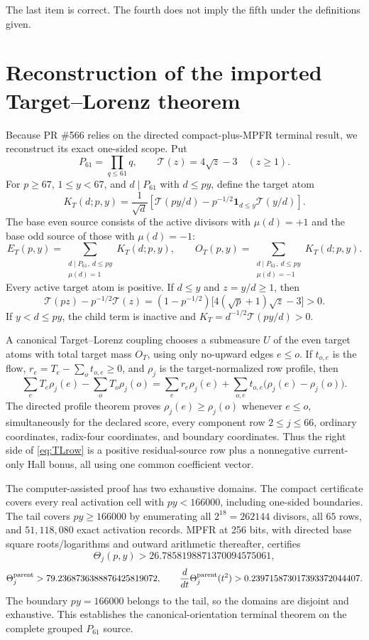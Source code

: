 \documentclass[11pt]{article}
\newcommand{\1}{\mathbf 1}
\begin{document}
The last item is correct.  The fourth does not imply the fifth under the definitions given.

\section{Reconstruction of the imported Target--Lorenz theorem}

Because PR \#566 relies on the directed compact-plus-MPFR terminal result, we reconstruct its exact one-sided scope.  Put
\[
P_{61}=\prod_{q\le61}q,
\qquad
\mathcal T(z)=4\sqrt z-3\quad(z\ge1).
\]
For $p\ge67$, $1\le y<67$, and $d\mid P_{61}$ with $d\le py$, define the target atom
\begin{equation}\label{eq:KT}
K_T(d;p,y)=\frac1{\sqrt d}
\left[\mathcal T(py/d)-p^{-1/2}\mathbf1_{d\le y}\mathcal T(y/d)\right].
\end{equation}
The base even source consists of the active divisors with $\mu(d)=+1$ and the base odd source of those with $\mu(d)=-1$:
\[
E_T(p,y)=\sum_{\substack{d\mid P_{61},\ d\le py\\\mu(d)=1}}K_T(d;p,y),
\qquad
O_T(p,y)=\sum_{\substack{d\mid P_{61},\ d\le py\\\mu(d)=-1}}K_T(d;p,y).
\]
Every active target atom is positive.  If $d\le y$ and $z=y/d\ge1$, then
\[
\mathcal T(pz)-p^{-1/2}\mathcal T(z)
=(1-p^{-1/2})\bigl[4(\sqrt p+1)\sqrt z-3\bigr]>0.
\]
If $y<d\le py$, the child term is inactive and $K_T=d^{-1/2}\mathcal T(py/d)>0$.

A canonical Target--Lorenz coupling chooses a submeasure $U$ of the even target atoms with total target mass $O_T$, using only no-upward edges $e\le o$.  If $t_{o,e}$ is the flow, $r_e=T_e-\sum_o t_{o,e}\ge0$, and $\rho_j$ is the target-normalized row profile, then
\begin{equation}\label{eq:TLrow}
\sum_eT_e\rho_j(e)-\sum_oT_o\rho_j(o)
=\sum_e r_e\rho_j(e)
+\sum_{o,e}t_{o,e}\bigl(\rho_j(e)-\rho_j(o)\bigr).
\end{equation}
The directed profile theorem proves $\rho_j(e)\ge\rho_j(o)$ whenever $e\le o$, simultaneously for the declared score, every component row $2\le j\le66$, ordinary coordinates, radix-four coordinates, and boundary coordinates.  Thus the right side of \eqref{eq:TLrow} is a positive residual-source row plus a nonnegative current-only Hall bonus, all using one common coefficient vector.

The computer-assisted proof has two exhaustive domains.  The compact certificate covers every real activation cell with $py<166000$, including one-sided boundaries.  The tail covers $py\ge166000$ by enumerating all $2^{18}=262144$ divisors, all $65$ rows, and $51{,}118{,}080$ exact activation records.  MPFR at 256 bits, with directed base square roots/logarithms and outward arithmetic thereafter, certifies
\[
\Theta_j(p,y)>26.7858198871370094575061,
\]
\[
\Theta_j^{\rm parent}>79.2368736388876425819072,
\qquad
\frac{d}{dt}\Theta_j^{\rm parent}(t^2)
>0.239715873017393372044407.
\]
The boundary $py=166000$ belongs to the tail, so the domains are disjoint and exhaustive.  This establishes the canonical-orientation terminal theorem on the complete grouped $P_{61}$ source.
\end{document}
